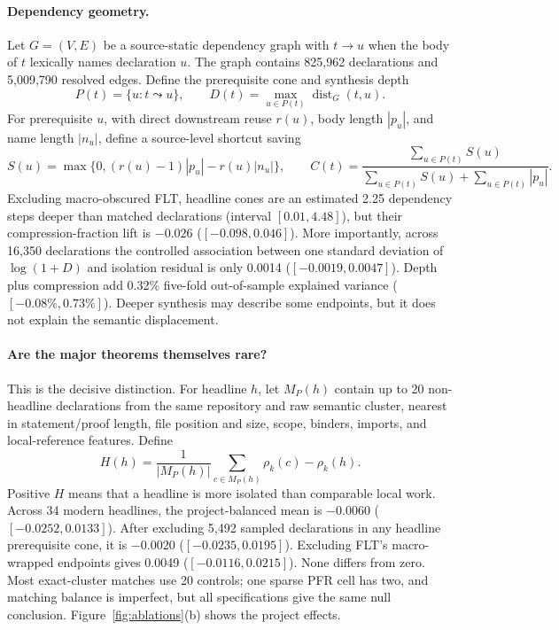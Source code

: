 \documentclass[10pt]{article}
\begin{document}
\paragraph{Dependency geometry.}
Let $G=(V,E)$ be a source-static dependency graph with $t\to u$ when the body
of $t$ lexically names declaration $u$.  The graph contains 825,962
declarations and 5,009,790 resolved edges.  Define the prerequisite cone and
synthesis depth
\[
 P(t)=\{u:t\leadsto u\},\qquad
 D(t)=\max_{u\in P(t)}\operatorname{dist}_G(t,u).
 \tag{3}
\]
For prerequisite $u$, with direct downstream reuse $r(u)$, body length
$|p_u|$, and name length $|n_u|$, define a source-level shortcut saving
\[
 S(u)=\max\{0,(r(u)-1)|p_u|-r(u)|n_u|\},\qquad
 C(t)=\frac{\sum_{u\in P(t)}S(u)}
 {\sum_{u\in P(t)}S(u)+\sum_{u\in P(t)}|p_u|}.
 \tag{4}
\]
Excluding macro-obscured FLT, headline cones are an estimated 2.25 dependency
steps deeper than matched declarations (interval $[0.01,4.48]$), but their
compression-fraction lift is $-0.026$ ($[-0.098,0.046]$).  More importantly,
across 16,350 declarations the controlled association between one standard
deviation of $\log(1+D)$ and isolation residual is only 0.0014
($[-0.0019,0.0047]$).  Depth plus compression add 0.32\% five-fold
out-of-sample explained variance ($[-0.08\%,0.73\%]$).  Deeper synthesis may
describe some endpoints, but it does not explain the semantic displacement.

\paragraph{Are the major theorems themselves rare?}
This is the decisive distinction.  For headline $h$, let $M_P(h)$ contain up
to 20 non-headline declarations from the same repository and raw semantic
cluster, nearest in statement/proof length, file position and size, scope,
binders, imports, and local-reference features.  Define
\[
 H(h)=\frac1{|M_P(h)|}\sum_{c\in M_P(h)}\rho_k(c)-\rho_k(h).
 \tag{5}
\]
Positive $H$ means that a headline is more isolated than comparable local
work.  Across 34 modern headlines, the project-balanced mean is $-0.0060$
($[-0.0252,0.0133]$).  After excluding 5,492 sampled declarations in any
headline prerequisite cone, it is $-0.0020$ ($[-0.0235,0.0195]$).  Excluding
FLT's macro-wrapped endpoints gives 0.0049 ($[-0.0116,0.0215]$).  None differs
from zero.  Most exact-cluster matches use 20 controls; one sparse PFR cell has
two, and matching balance is imperfect, but all specifications give the same
null conclusion.  Figure~\ref{fig:ablations}(b) shows the project effects.
\end{document}

